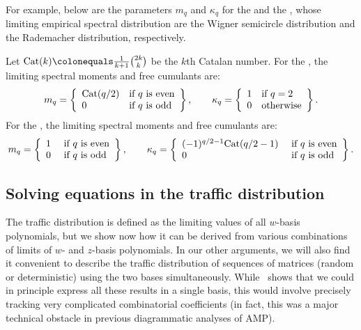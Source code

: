 For example, below are the parameters $m_q$ and $\kappa_q$
for the \goe and the \rom, whose limiting empirical spectral distribution
are the Wigner semicircle distribution and the Rademacher distribution, respectively.

\begin{claim}\label{claim:rom-cumulants}
    Let $\textnormal{Cat}(k) \colonequals \frac{1}{k + 1}\binom{2k}{k}$ be the $k$th Catalan number.
    For the \goe, the limiting spectral moments and free cumulants are:
    \begin{align*}
        m_q = \left\{\begin{array}{ll}
            \textnormal{Cat}(q/2) & \textnormal{if $q$\text{ is even}}\\
            0 & \textnormal{if $q$\text{ is odd}}
        \end{array}
        \right\}, \qquad 
        \kappa_q = \left\{\begin{array}{ll}
            1 & \textnormal{if $q = 2$}\\
            0 & \textnormal{otherwise}
        \end{array}\right\}.
    \end{align*}        
    For the \rom, the limiting spectral moments and free cumulants are:
    \begin{align}
    m_q = \left\{\begin{array}{ll}
        1 & \textnormal{ if $q$ is even}\\
        0 & \textnormal{ if $q$ is odd}
    \end{array}\right\}, \qquad
    \kappa_q = \left\{\begin{array}{ll}
        (-1)^{q/2-1} \textnormal{Cat}(q/2 - 1) & \textnormal{ if $q$ is even}\\
        0 & \textnormal{ if $q$ is odd}
    \end{array}\right\}.\label{eq:freeCumulantROM}
\end{align}
\end{claim}


\subsection{Solving equations in the traffic distribution}

The traffic distribution is defined as the limiting values of all $w$-basis polynomials, but we show now how it can be derived from various combinations of limits of $w$- and $z$-basis polynomials.
In our other arguments, we will also find it convenient to describe
the traffic distribution of sequences of matrices (random or deterministic)
using the two bases simultaneously.
While~ shows
that we could in principle express all these results
in a single basis, this would involve
precisely tracking 
very complicated combinatorial coefficients
(in fact, this was a major technical obstacle in
previous diagrammatic analyses of AMP).

